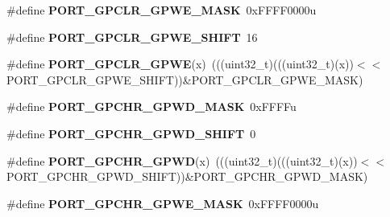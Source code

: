 \begin{DoxyCompactItemize}
\item 
\#define {\bfseries P\+O\+R\+T\+\_\+\+G\+P\+C\+L\+R\+\_\+\+G\+P\+W\+E\+\_\+\+M\+A\+SK}~0x\+F\+F\+F\+F0000u\hypertarget{group__PORT__Register__Masks_ga49c4160370859546837be80a2eed1365}{}\label{group__PORT__Register__Masks_ga49c4160370859546837be80a2eed1365}

\item 
\#define {\bfseries P\+O\+R\+T\+\_\+\+G\+P\+C\+L\+R\+\_\+\+G\+P\+W\+E\+\_\+\+S\+H\+I\+FT}~16\hypertarget{group__PORT__Register__Masks_ga340d6aadd9516b3cac26187b014ce9d3}{}\label{group__PORT__Register__Masks_ga340d6aadd9516b3cac26187b014ce9d3}

\item 
\#define {\bfseries P\+O\+R\+T\+\_\+\+G\+P\+C\+L\+R\+\_\+\+G\+P\+WE}(x)~(((uint32\+\_\+t)(((uint32\+\_\+t)(x))$<$$<$P\+O\+R\+T\+\_\+\+G\+P\+C\+L\+R\+\_\+\+G\+P\+W\+E\+\_\+\+S\+H\+I\+FT))\&P\+O\+R\+T\+\_\+\+G\+P\+C\+L\+R\+\_\+\+G\+P\+W\+E\+\_\+\+M\+A\+SK)\hypertarget{group__PORT__Register__Masks_ga52502515ea180d574d919f0ec155da74}{}\label{group__PORT__Register__Masks_ga52502515ea180d574d919f0ec155da74}

\item 
\#define {\bfseries P\+O\+R\+T\+\_\+\+G\+P\+C\+H\+R\+\_\+\+G\+P\+W\+D\+\_\+\+M\+A\+SK}~0x\+F\+F\+F\+Fu\hypertarget{group__PORT__Register__Masks_ga4f288d1140184d41384f459c263d6e63}{}\label{group__PORT__Register__Masks_ga4f288d1140184d41384f459c263d6e63}

\item 
\#define {\bfseries P\+O\+R\+T\+\_\+\+G\+P\+C\+H\+R\+\_\+\+G\+P\+W\+D\+\_\+\+S\+H\+I\+FT}~0\hypertarget{group__PORT__Register__Masks_gab4464bb98b737fbf75d42682fef3c09c}{}\label{group__PORT__Register__Masks_gab4464bb98b737fbf75d42682fef3c09c}

\item 
\#define {\bfseries P\+O\+R\+T\+\_\+\+G\+P\+C\+H\+R\+\_\+\+G\+P\+WD}(x)~(((uint32\+\_\+t)(((uint32\+\_\+t)(x))$<$$<$P\+O\+R\+T\+\_\+\+G\+P\+C\+H\+R\+\_\+\+G\+P\+W\+D\+\_\+\+S\+H\+I\+FT))\&P\+O\+R\+T\+\_\+\+G\+P\+C\+H\+R\+\_\+\+G\+P\+W\+D\+\_\+\+M\+A\+SK)\hypertarget{group__PORT__Register__Masks_ga47cddb6551f05cf4810b6f7d96084540}{}\label{group__PORT__Register__Masks_ga47cddb6551f05cf4810b6f7d96084540}

\item 
\#define {\bfseries P\+O\+R\+T\+\_\+\+G\+P\+C\+H\+R\+\_\+\+G\+P\+W\+E\+\_\+\+M\+A\+SK}~0x\+F\+F\+F\+F0000u\hypertarget{group__PORT__Register__Masks_ga5e60b77e9d69fc09654c8034e31df7b5}{}\label{group__PORT__Register__Masks_ga5e60b77e9d69fc09654c8034e31df7b5}


\end{DoxyCompactItemize}
